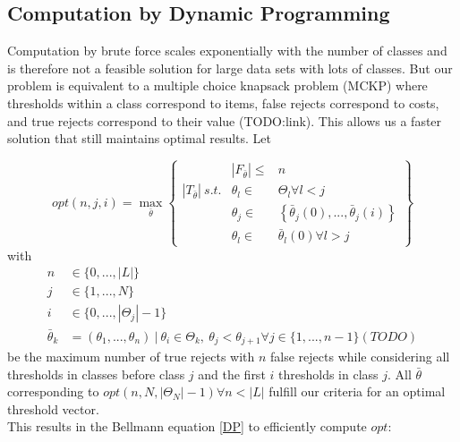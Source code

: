 \subsection{Computation by Dynamic Programming}
\label{dp}
Computation by brute force scales exponentially with the number of classes and is therefore not a feasible solution for large data sets with lots of classes. But our problem is equivalent to a multiple choice knapsack problem (MCKP) where thresholds within a class correspond to items, false rejects correspond to costs, and true rejects correspond to their value (TODO:link). This allows us a faster solution that still maintains optimal results.
Let

$$
opt(n,j,i) = \max_{\bar{\theta}}
\begin{Bmatrix}
	 & \left|F_{\bar{\theta}}\right| \leq  & n \\
  	\left|T_{\bar{\theta}}\right| \ s.t. & \theta_l \in & \Theta_l \forall l < j \\
  	 & \theta_j \in & \left\{\bar{\theta}_j(0),...,\bar{\theta}_j(i)\right\} \\
  	 & \theta_l \in & \bar{\theta}_l(0) \forall l > j
\end{Bmatrix}
$$
with 
\begin{align}
	n &\in \{0,...,|L|\} \\
	j &\in \{1,...,N\} \\
	i &\in \{0,...,\left|\Theta_j\right|-1\} \\
	\bar{\theta}_k &= (\theta_1,...,\theta_n) \ | \ \theta_i \in \Theta_k, \ \theta_j < \theta_{j+1} \forall j \in \{1,...,n-1\} (TODO)
\end{align}
be the maximum number of true rejects with $n$ false rejects while considering all thresholds in classes before class $j$ and the first $i$ thresholds in class $j$. All $\bar{\theta}$ corresponding to $opt(n,N,\left|\Theta_N\right|-1) \forall n<\left|L\right|$ fulfill our criteria for an optimal threshold vector. \\
This results in the Bellmann equation \ref{DP} to efficiently compute $opt$:

